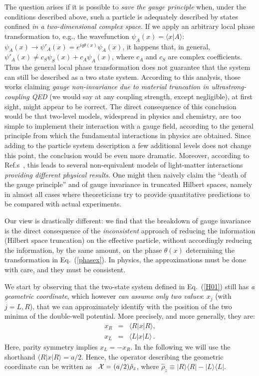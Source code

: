 \documentclass[aps,pra,reprint, superscriptaddress,amsmath,showpacs,longbibliography]{revtex4-2}
\renewcommand{\eqref}[1]{\mbox{Eq.~(\ref{#1})}}
\newcommand{\bea}{\begin{eqnarray}}
\newcommand{\eea}{\end{eqnarray}}
\newcommand{\qum}[1]{``#1''}
\begin{document}
The question arises if it is possible to {\em save the gauge principle} when, under the conditions described above, such a particle is adequately described by states confined {\em in a two-dimensional complex space}.
If we apply an arbitrary local phase transformation to, e.g., the wavefunction $\psi_A(x) = \langle x | A \rangle$: $\psi_A(x) \to \psi'_A(x) = e^{i q \theta(x) }\psi_A(x)$, it happens that, in general, $\psi'_A(x) \neq c_S \psi_S(x) + c_A \psi_A(x)$, where $c_A$ and $c_S$ are complex coefficients. Thus the general local phase transformation does not guarantee that the system can still be described as a two state system. According to this analysis, those works claiming {\em gauge non-invariance due to material truncation in ultrastrong-coupling QED}
\cite{Stokes2019a} (we would say at any coupling strength, except negligible),  at first sight, might appear to be correct. The
direct consequence of this conclusion would be that two-level models, widespread in physics and chemistry, are too simple to implement their interaction with a gauge field, according to the general principle from which the fundamental interactions in physics are obtained. Since adding to the particle system description a few additional levels does  not change this point, the conclusion would be even more dramatic. Moreover, according to Ref.s~\cite{Stokes2019, Stokes2020a},  this leads to several non-equivalent models of light-matter interactions {\em providing different physical results}. 
One might then naively claim the \qum{death of the gauge principle} and of gauge invariance in truncated Hilbert spaces, 
namely in almost all cases where theoreticians try to provide quantitative predictions to be compared with actual experiments. 

Our view is drastically different: we find that the breakdown of gauge invariance is the direct consequence of the {\em inconsistent} approach  of reducing the information (Hilbert space truncation) on the effective particle,  without accordingly reducing the information, by the same amount, on the phase $\theta(x)$ determining the transformation in \eqref{phasex}. In physics, the approximations must be done with care, and they must be consistent.


We start by observing that the two-state system defined in \eqref{H01} {still has} {\em a geometric coordinate}, which however {\em can assume only two values}: $x_j$ (with $j= L, R$), {that} we can approximately identify with the position of the two minima of the double-well potential. More precisely, and {more} generally, they are:
\bea\label{xr}
x_R &=&  \langle R | x | R \rangle
, \nonumber \\
x_L &=& \langle L | x | L \rangle\, .
\eea
Here, parity symmetry implies $x_L = - x_R$. In the following we will use the shorthand $\langle R | x | R \rangle = a/2$. Hence, the operator describing the geometric coordinate can be written as~\cite{Leggett1987}
${\cal X} = (a/2) \hat \rho_z$, where $\hat \rho_z \equiv | R \rangle \langle R| - | L \rangle \langle L |$.
\end{document}
